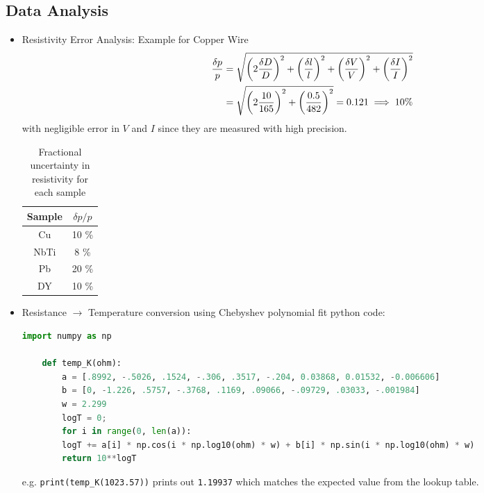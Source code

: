 \documentclass{article}
\begin{document}
\subsection{Data Analysis}
\begin{itemize}
    \item Resistivity Error Analysis: Example for Copper Wire
    \begin{align*}
        \frac{\delta p}{p} &= \sqrt{\qt(2 \frac{\delta D}{D})^2 + \qt(\frac{\delta l}{l})^2 + \qt(\frac{\delta V}{V})^2 + \qt(\frac{\delta I}{I})^2} \\
        &= \sqrt{\qt(2 \frac{10}{165})^2 + \qt(\frac{0.5}{482})^2} = 0.121 \implies 10 \%
    \end{align*}
    with negligible error in $V$ and $I$ since they are measured with high precision.
    \begin{table}[ht]
        \centering
        \begin{tabular}{|c|c|}
            \hline
            Sample & $\delta p/p$ \\
            \hline
            Cu & 10 \% \\
            \hline
            NbTi & 8 \% \\
            \hline
            Pb & 20 \% \\
            \hline
            DY & 10 \% \\
            \hline
        \end{tabular}
        \caption{Fractional uncertainty in resistivity for each sample}
        \label{tab:resistivity}
    \end{table}
    \item Resistance $\to$ Temperature conversion using Chebyshev polynomial fit python code:
    \begin{lstlisting}[language=Python]
    import numpy as np

    def temp_K(ohm):
        a = [.8992, -.5026, .1524, -.306, .3517, -.204, 0.03868, 0.01532, -0.006606]
        b = [0, -1.226, .5757, -.3768, .1169, .09066, -.09729, .03033, -.001984]
        w = 2.299
        logT = 0;
        for i in range(0, len(a)):
        logT += a[i] * np.cos(i * np.log10(ohm) * w) + b[i] * np.sin(i * np.log10(ohm) * w)
        return 10**logT
    \end{lstlisting}
    e.g. \texttt{print(temp\_K(1023.57))} prints out \texttt{1.19937} which matches the expected value from the lookup table.


\end{itemize}
\end{document}
